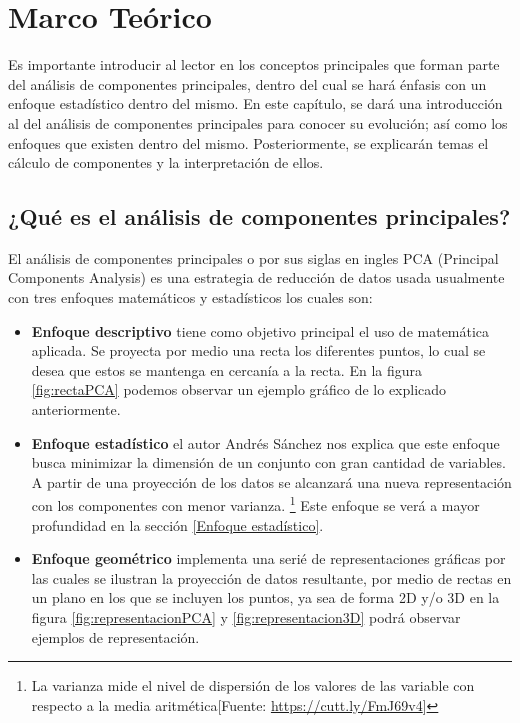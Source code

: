 \chapter{Marco Teórico}
\label{ch:Marco Teórico}

Es importante introducir al lector en los conceptos principales que forman parte del análisis de componentes principales, dentro del cual se hará énfasis con un enfoque estadístico dentro del mismo. En este capítulo, se dará una introducción al del análisis de componentes principales para conocer su evolución; así como los enfoques que existen dentro del mismo. Posteriormente, se explicarán temas el cálculo de componentes y la interpretación de ellos.

\section{¿Qué es el análisis de componentes principales?}

El análisis de componentes principales o por sus siglas en ingles PCA (Principal Components Analysis) es una estrategia de reducción de datos usada usualmente con tres enfoques matemáticos y estadísticos los cuales son:  

\begin{itemize}
    \item \textbf{Enfoque descriptivo} tiene como objetivo principal el uso de matemática aplicada. Se proyecta por medio una recta los diferentes puntos, lo cual se desea que estos se mantenga en cercanía a la recta. En la figura \ref{fig:rectaPCA} podemos observar un ejemplo gráfico de lo explicado anteriormente.   
    \item \textbf{Enfoque estadístico} el autor Andrés Sánchez nos explica que este enfoque busca minimizar la dimensión de un conjunto con gran cantidad de variables. A partir de una proyección de los datos se alcanzará una nueva representación con los componentes con menor varianza. \footnote{La varianza mide el nivel de dispersión de los valores de las variable con respecto a la media  aritmética[Fuente: \href{https://cutt.ly/FmJ69v4}{https://cutt.ly/FmJ69v4}]} Este enfoque se verá a mayor profundidad en la sección \ref{Enfoque estadístico}. \cite{andresSanchesMangas}
    \item \textbf{Enfoque geométrico} implementa una serié de representaciones gráficas por las cuales se ilustran la proyección de datos resultante, por medio de rectas en un plano en los que se incluyen los puntos, ya sea de forma 2D y/o 3D en la figura \ref{fig:representacionPCA} y \ref{fig:representacion3D} podrá observar ejemplos de representación. 
\end{itemize}

